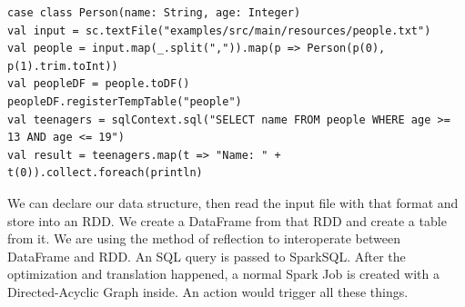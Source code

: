 \begin{lstlisting}
case class Person(name: String, age: Integer)
val input = sc.textFile("examples/src/main/resources/people.txt")
val people = input.map(_.split(",")).map(p => Person(p(0), p(1).trim.toInt))
val peopleDF = people.toDF()
peopleDF.registerTempTable("people")
val teenagers = sqlContext.sql("SELECT name FROM people WHERE age >= 13 AND age <= 19")
val result = teenagers.map(t => "Name: " + t(0)).collect.foreach(println)
\end{lstlisting}

We can declare our data structure, then read the input file with that format and store into an RDD. We create a DataFrame from that RDD and create a table from it. We are using the method of reflection to interoperate between DataFrame and RDD. An SQL query is passed to SparkSQL. After the optimization and translation happened, a normal Spark Job is created with a Directed-Acyclic Graph inside. An action would trigger all these things.

